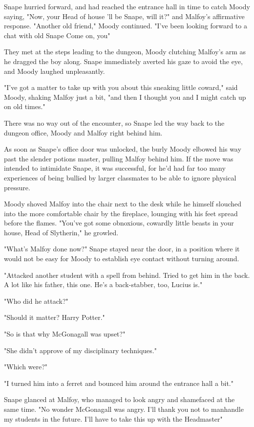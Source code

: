 Snape hurried forward, and had reached the entrance hall in time to catch Moody saying, "Now, your Head of house 'll be Snape, will it?" and Malfoy's affirmative response. "Another old friend," Moody continued. "I've been looking forward to a chat with old Snape{\el} Come on, you{\el}"

They met at the steps leading to the dungeon, Moody clutching Malfoy's arm as he dragged the boy along. Snape immediately averted his gaze to avoid the eye, and Moody laughed unpleasantly.

"I've got a matter to take up with you about this sneaking little coward," said Moody, shaking Malfoy just a bit, "and then I thought you and I might catch up on old times."

There was no way out of the encounter, so Snape led the way back to the dungeon office, Moody and Malfoy right behind him.

As soon as Snape's office door was unlocked, the burly Moody elbowed his way past the slender potions master, pulling Malfoy behind him. If the move was intended to intimidate Snape, it was successful, for he'd had far too many experiences of being bullied by larger classmates to be able to ignore physical pressure.

Moody shoved Malfoy into the chair next to the desk while he himself slouched into the more comfortable chair by the fireplace, lounging with his feet spread before the flames. "You've got some obnoxious, cowardly little beasts in your house, Head of Slytherin," he growled.

"What's Malfoy done now?" Snape stayed near the door, in a position where it would not be easy for Moody to establish eye contact without turning around.

"Attacked another student with a spell from behind. Tried to get him in the back. A lot like his father, this one. He's a back-stabber, too, Lucius is."

"Who did he attack?"

"Should it matter? Harry Potter."

"So is that why McGonagall was upset?"

"She didn't approve of my disciplinary techniques."

"Which were?"

"I turned him into a ferret and bounced him around the entrance hall a bit."

Snape glanced at Malfoy, who managed to look angry and shamefaced at the same time. "No wonder McGonagall was angry. I'll thank you not to manhandle my students in the future. I'll have to take this up with the Headmaster{\el}"

